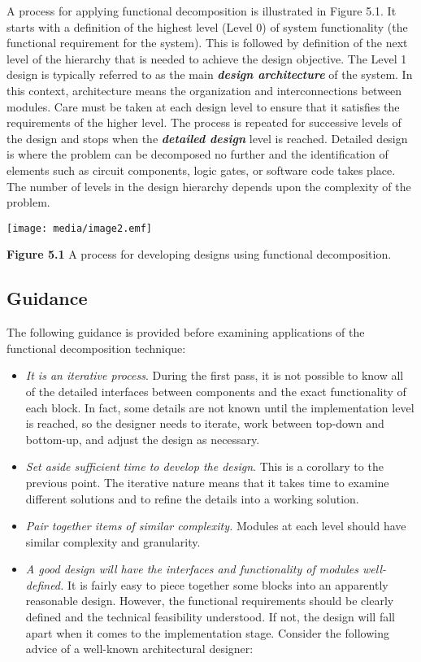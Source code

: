 A process for applying functional decomposition is illustrated in Figure
5.1. It starts with a definition of the highest level (Level 0) of
system functionality (the functional requirement for the system). This
is followed by definition of the next level of the hierarchy that is
needed to achieve the design objective. The Level 1 design is typically
referred to as the main \emph{\textbf{design architecture}} of the
system. In this context, architecture means the organization and
interconnections between modules. Care must be taken at each design
level to ensure that it satisfies the requirements of the higher level.
The process is repeated for successive levels of the design and stops
when the \emph{\textbf{detailed design}} level is reached. Detailed
design is where the problem can be decomposed no further and the
identification of elements such as circuit components, logic gates, or
software code takes place. The number of levels in the design hierarchy
depends upon the complexity of the problem.

\texttt{[image: media/image2.emf]}

\textbf{Figure 5.1} A process for developing designs using functional
decomposition.

\subsection{Guidance}\label{guidance}

The following guidance is provided before examining applications of the
functional decomposition technique:

\begin{itemize}
\item
  \emph{It is an iterative process}. During the first pass, it is not
  possible to know all of the detailed interfaces between components and
  the exact functionality of each block. In fact, some details are not
  known until the implementation level is reached, so the designer needs
  to iterate, work between top-down and bottom-up, and adjust the design
  as necessary.
\item
  \emph{Set aside sufficient time to develop the design}. This is a
  corollary to the previous point. The iterative nature means that it
  takes time to examine different solutions and to refine the details
  into a working solution.
\item
  \emph{Pair together items of similar complexity.} Modules at each
  level should have similar complexity and granularity.
\item
  \emph{A good design will have the interfaces and functionality of
  modules well-defined.} It is fairly easy to piece together some blocks
  into an apparently reasonable design. However, the functional
  requirements should be clearly defined and the technical feasibility
  understood. If not, the design will fall apart when it comes to the
  implementation stage. Consider the following advice of a well-known
  architectural designer:
\end{itemize}

